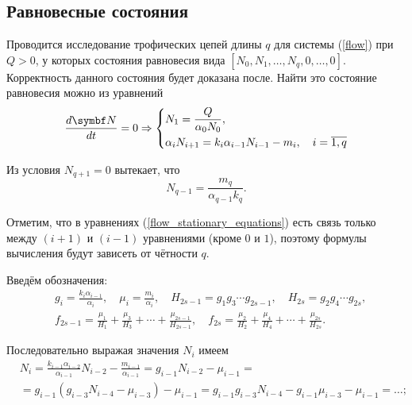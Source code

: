 \subsection{Равновесные состояния}
    Проводится исследование трофических цепей длины \(q\) для системы (\ref{flow}) при \(Q > 0\), у которых состояния равновесия вида \(\left[ N_0, N_1, \ldots, N_q, 0, \ldots, 0 \right]\). Корректность данного состояния будет доказана после. Найти это состояние равновесия можно из уравнений
    \begin{equation} \label{flow_stationary_equations}
        \frac{d \mb{N}}{dt} = 0 \Rightarrow
        \left\lbrace\begin{split}
            & N_1 = \frac{Q}{\alpha_0 N_0}, \\
            & \alpha_i N_{i+1} = k_i \alpha_{i-1} N_{i-1} - m_i, \quad i=\overline{1,q}                
        \end{split}\right.
    \end{equation}

    Из условия \( N_{q+1} = 0 \) вытекает, что 
    \begin{equation}
        N_{q-1} = \frac{m_q}{\alpha_{q-1} k_q}.
    \end{equation}

    Отметим, что в уравнениях (\ref{flow_stationary_equations}) есть связь только между \((i+1)\) и \((i-1)\) уравнениями (кроме \(0\) и \(1\)), поэтому формулы вычисления будут зависеть от чётности \(q\).

    Введём обозначения:
    \begin{equation} \label{flow_sub}
        \begin{split}
        & g_i = \frac{k_i \alpha_{i-1}}{\alpha_i}, \quad \mu_i = \frac{m_i}{\alpha_i}, \quad
        H_{2s-1} = g_1 g_3 \cdots g_{2s-1}, \quad H_{2s} = g_2 g_4 \cdots g_{2s}, \\
        & f_{2s-1} = \frac{\mu_1}{H_1} + \frac{\mu_3}{H_3} + \cdots + \frac{\mu_{2s-1}}{H_{2s-1}}, \quad
        f_{2s} = \frac{\mu_2}{H_2} + \frac{\mu_4}{H_4} + \cdots + \frac{\mu_{2s}}{H_{2s}}.
        \end{split}
    \end{equation}

    Последовательно выражая значения \(N_{i}\) имеем
    \begin{equation*}
        \begin{split}
            & N_{i} = \frac{k_{i-1} \alpha_{i-2}}{\alpha_{i-1}} N_{i-2} - \frac{m_{i-1}}{\alpha_{i-1}} = g_{i-1} N_{i-2} - \mu_{i-1} =\\ 
            &= g_{i-1} \left( g_{i-3} N_{i-4} - \mu_{i-3} \right) - \mu_{i-1} = g_{i-1} g_{i-3} N_{i-4} - g_{i-1} \mu_{i-3} - \mu_{i-1} = \dots ;
        \end{split}
    \end{equation*}

